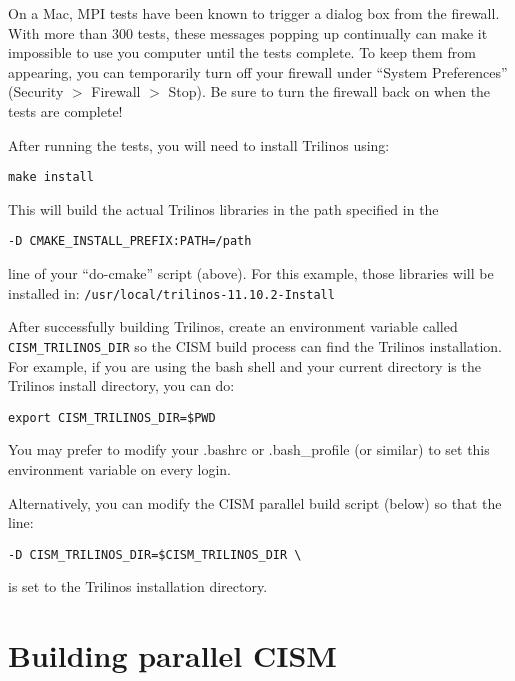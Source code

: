 \begin{mdframed}[style=mac] %
On a Mac, MPI tests have been known to trigger a dialog box from the firewall. 
With more than 300 tests, these messages popping up continually can make it impossible 
to use you computer until the tests complete. To keep them from appearing, you can temporarily 
turn off your firewall under ``System Preferences'' (Security $>$ Firewall $>$ Stop). 
Be sure to turn the firewall back on when the tests are complete!
\end{mdframed}              %

After running the tests, you will need to install Trilinos using:

 \texttt{make install}

\noindent
This will build the actual Trilinos libraries in the path specified in the

\begin{verbatim}
-D CMAKE_INSTALL_PREFIX:PATH=/path
\end{verbatim} 

\noindent
line of your ``do-cmake'' script (above). For this example, those libraries will be 
installed in: \texttt{/usr/local/trilinos-11.10.2-Install}

After successfully building Trilinos, create an environment variable called \texttt{CISM\_TRILINOS\_DIR}
so the CISM build process can find the Trilinos installation.  For example, if you 
are using the bash shell and your current directory is the Trilinos install directory, you can do:
\begin{verbatim}
export CISM_TRILINOS_DIR=$PWD
\end{verbatim}
You may prefer to modify your .bashrc or .bash\_profile (or similar)
to set this environment variable on every login.

Alternatively, you can modify the CISM parallel build script (below) so that the line:
\begin{verbatim}
-D CISM_TRILINOS_DIR=$CISM_TRILINOS_DIR \
\end{verbatim}
is set to the Trilinos installation directory.





\section{Building parallel CISM}

